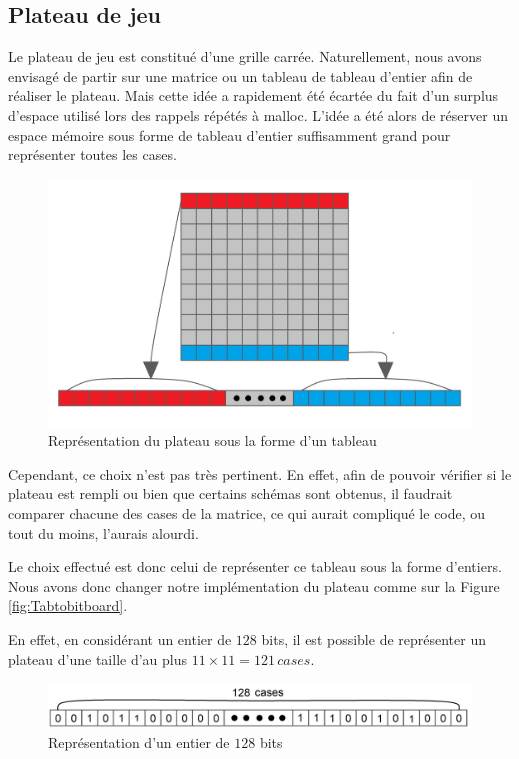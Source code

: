 \documentclass[a4paper,11pt]{article}
\begin{document}
\subsection{Plateau de jeu}
\label{subsct:plateau}

Le plateau de jeu est constitué d'une grille carrée. Naturellement, nous avons envisagé de partir sur une matrice ou un tableau de tableau d'entier afin de réaliser le plateau. Mais cette idée a rapidement été écartée du fait d'un surplus d'espace utilisé lors des rappels répétés à malloc. L'idée a été alors de réserver un espace mémoire sous forme de tableau d'entier suffisamment grand pour représenter toutes les cases.
\begin{figure}[h]
    \centering
    \includegraphics[scale=0.20]{Board_en_ligne.png}
    \caption{Représentation du plateau sous la forme d'un tableau}
    \label{fig:Board_ligne}
\end{figure}

\bigbreak

Cependant, ce choix n'est pas très pertinent. En effet, afin de pouvoir vérifier si le plateau est rempli ou bien que certains schémas sont obtenus, il faudrait comparer chacune des cases de la matrice, ce qui aurait compliqué le code, ou tout du moins, l'aurais alourdi.

Le choix effectué est donc celui de représenter ce tableau sous la forme d'entiers. Nous avons donc changer notre implémentation du plateau comme sur la Figure \ref{fig:Tabtobitboard}.

En effet, en considérant un entier de $128$ bits, il est possible de représenter un plateau d'une taille d'au plus $11\times11 = 121\,cases$.

\begin{figure}[h]
    \centering
    \includegraphics[scale=0.20]{Int_128.png}
    \caption{Représentation d'un entier de $128$ bits}
    \label{fig:Int_128}
\end{figure}
\end{document}
